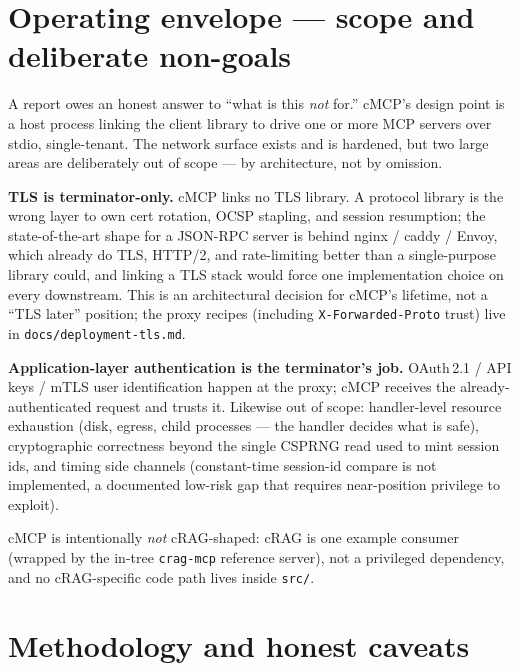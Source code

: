 \documentclass[10pt]{article}
\newcommand{\code}[1]{\texttt{\small #1}}
\begin{document}
\section{Operating envelope --- scope and deliberate non-goals}

A report owes an honest answer to ``what is this \emph{not} for.'' cMCP's design
point is a host process linking the client library to drive one or more MCP
servers over stdio, single-tenant. The network surface exists and is hardened,
but two large areas are deliberately out of scope --- by architecture, not by
omission.

\textbf{TLS is terminator-only.} cMCP links no TLS library. A protocol library
is the wrong layer to own cert rotation, OCSP stapling, and session resumption;
the state-of-the-art shape for a JSON-RPC server is behind nginx / caddy /
Envoy, which already do TLS, HTTP/2, and rate-limiting better than a
single-purpose library could, and linking a TLS stack would force one
implementation choice on every downstream. This is an architectural decision
for cMCP's lifetime, not a ``TLS later'' position; the proxy recipes (including
\code{X-Forwarded-Proto} trust) live in \code{docs/deployment-tls.md}.

\textbf{Application-layer authentication is the terminator's job.} OAuth\,2.1 /
API keys / mTLS user identification happen at the proxy; cMCP receives the
already-authenticated request and trusts it. Likewise out of scope: handler-level
resource exhaustion (disk, egress, child processes --- the handler decides
what is safe), cryptographic correctness beyond the single CSPRNG read used to
mint session ids, and timing side channels (constant-time session-id compare is
not implemented, a documented low-risk gap that requires near-position
privilege to exploit).

cMCP is intentionally \emph{not} cRAG-shaped: cRAG is one example consumer
(wrapped by the in-tree \code{crag-mcp} reference server), not a privileged
dependency, and no cRAG-specific code path lives inside \code{src/}.

\section{Methodology and honest caveats}
\end{document}
